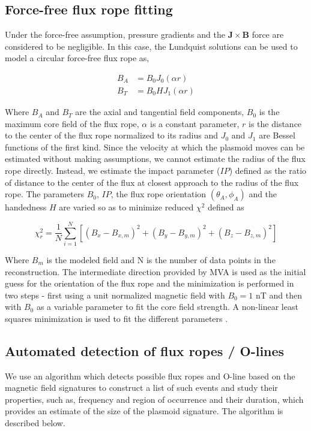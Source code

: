 \subsection{Force-free flux rope fitting}
Under the force-free assumption, pressure gradients and the $\mathbf{J}\times\mathbf{B}$ force are considered to be negligible. In this case, the Lundquist solutions can be used to model a circular force-free flux rope \cite{Lepping1990MagneticAU,Slavin2003GeotailSheet} as, 

\begin{align}
    B_A & = B_0 J_0 \left( \alpha r \right)\\
    B_T & = B_0 H J_1 \left( \alpha r \right)
\end{align}

Where $B_A$ and $B_T$ are the axial and tangential field components, $B_0$ is the maximum core field of the flux rope, $\alpha$ is a constant parameter, $r$ is the distance to the center of the flux rope normalized to its radius and $J_0$ and $J_1$ are Bessel functions of the first kind. Since the velocity at which the plasmoid moves can be estimated without making assumptions, we cannot estimate the radius of the flux rope directly. Instead, we estimate the impact parameter ($IP$) defined as the ratio of distance to the center of the flux at closest approach to the radius of the flux rope. The parameters $B_0$, $IP$, the flux rope orientation $(\theta_A, \phi_A)$ and the handedness $H$ are varied so as to minimize reduced $\chi^2$ defined as \cite{Lepping1990MagneticAU}

\begin{equation}
    \chi_r^2 = \frac{1}{N} \sum_{i=1}^{N} \left[ \left(B_x - B_{x,m} \right)^2 + \left(B_y - B_{y,m} \right)^2 + \left(B_z - B_{z,m} \right)^2 \right]
\end{equation}

Where $B_m$ is the modeled field and N is the number of data points in the reconstruction. The intermediate direction provided by MVA is used as the initial guess for the orientation of the flux rope  and the minimization is performed in two steps - first using a unit normalized magnetic field with $B_0=1$ nT and then with $B_0$ as a variable parameter to fit the core field strength. A non-linear least squares minimization is used to fit the different parameters \cite{Newville2018Non-LinearPython}. 

\subsection{Automated detection of flux ropes / O-lines}
We use an algorithm which detects possible flux ropes and O-line based on the magnetic field signatures to construct a list of such events and study their properties, such as, frequency and region of occurrence and their duration, which provides an estimate of the size of the plasmoid signature. The algorithm is described below. 

